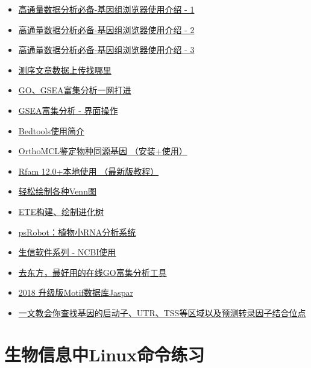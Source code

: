 \documentclass[]{article}
\providecommand{\tightlist}{%
  \setlength{\itemsep}{0pt}\setlength{\parskip}{0pt}}
\numberwithin{figure}{section}
\numberwithin{table}{section}
\begin{document}
\begin{itemize}
\tightlist
\item
  \href{https://mp.weixin.qq.com/s/_5zoRvjku5pb9qtwrvlWYw}{高通量数据分析必备-基因组浏览器使用介绍 - 1}
\item
  \href{https://mp.weixin.qq.com/s/uzyccMorR6XWqjMsMd3Oaw}{高通量数据分析必备-基因组浏览器使用介绍 - 2}
\item
  \href{https://mp.weixin.qq.com/s/qdKxBAU__nbq8Ua0rLCEow}{高通量数据分析必备-基因组浏览器使用介绍 - 3}
\item
  \href{http://mp.weixin.qq.com/s/aDINq43Xwas_l4-AdY7xXg}{测序文章数据上传找哪里}
\item
  \href{http://mp.weixin.qq.com/s/d1KCETQZ88yaOLGwAtpWYg}{GO、GSEA富集分析一网打进}
\item
  \href{http://mp.weixin.qq.com/s/3Nd3urhfRGkw-F0LGZrlZQ}{GSEA富集分析 - 界面操作}
\item
  \href{https://mp.weixin.qq.com/s/bIXom5bSDov-4sPqsTRc6A}{Bedtools使用简介}
\item
  \href{https://mp.weixin.qq.com/s/lC1KiRygr5RefMZLVPREdQ}{OrthoMCL鉴定物种同源基因 （安装+使用）}
\item
  \href{http://mp.weixin.qq.com/s/5OIRHA22ZLr5Z8bEhDiBqg}{Rfam 12.0+本地使用 （最新版教程）}
\item
  \href{http://mp.weixin.qq.com/s/zn654JqG9OeO71rJUTDr2Q}{轻松绘制各种Venn图}
\item
  \href{http://mp.weixin.qq.com/s/DD1nZnx5mYxWGrohNgdPvQ}{ETE构建、绘制进化树}
\item
  \href{http://mp.weixin.qq.com/s/kWkEQOX-6SKMAUQmAuc86w}{psRobot：植物小RNA分析系统}
\item
  \href{http://mp.weixin.qq.com/s/4a5U8GdBoNFXkykL6m2EeA}{生信软件系列 - NCBI使用}
\item
  \href{https://mp.weixin.qq.com/s/l6j2encDfEQkt2UeNCMFhg}{去东方，最好用的在线GO富集分析工具}
\item
  \href{https://mp.weixin.qq.com/s/S1SlhNfPvcXOwRQZvrm6GQ}{2018 升级版Motif数据库Jaspar}
\item
  \href{https://mp.weixin.qq.com/s/vFO7uAtI6nh-zTW7RHCixA}{一文教会你查找基因的启动子、UTR、TSS等区域以及预测转录因子结合位点}
\end{itemize}

\hypertarget{bioinfo_linux}{%
\section{生物信息中Linux命令练习}\label{bioinfo_linux}}
\end{document}
